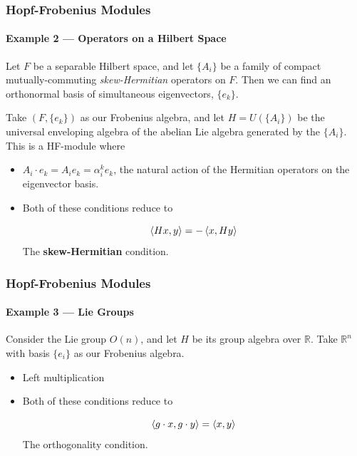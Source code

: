 \documentclass{beamer}
\begin{document}
\begin{frame}

\frametitle{Hopf-Frobenius Modules}
\framesubtitle{Example 2 --- Operators on a Hilbert Space}

Let $F$ be a separable Hilbert space, and let $\{ A_i \}$ be a family of compact mutually-commuting \textit{skew-Hermitian} operators on $F$. Then we can find an orthonormal basis of simultaneous eigenvectors, $\{ e_k \}$. 

Take $(F, \{ e_k \})$ as our Frobenius algebra, and let $H = U(\{ A_i \} )$ be the universal enveloping algebra of the abelian Lie algebra generated by the $\{ A_i \}$. This is a HF-module where


\begin{itemize}

\item {} $A_i \cdot e_k = A_i e_k = \alpha_{i}^k e_k$, the natural action of the Hermitian operators on the eigenvector basis.


\medskip

\item {} Both of these conditions reduce to

\begin{equation*}
\left\langle H x, y \right\rangle = - \left\langle x, Hy \right\rangle
\end{equation*}
The \textbf{skew-Hermitian} condition.
\end{itemize}



\end{frame}





\begin{frame}

\frametitle{Hopf-Frobenius Modules}
\framesubtitle{Example 3 --- Lie Groups}


Consider the Lie group $O(n)$, and let $H$ be its group algebra over $\mathbb{R}$. Take $\mathbb{R}^n$ with basis $\{ e_i \}$ as our Frobenius algebra.

\bigskip

\begin{itemize}

\item {} Left multiplication


\medskip

\item {} Both of these conditions reduce to

\begin{equation*}
\left\langle g \cdot x, g \cdot y \right\rangle = \left\langle x,y \right\rangle
\end{equation*}
The orthogonality condition.

\end{itemize}




\end{frame}
\end{document}
